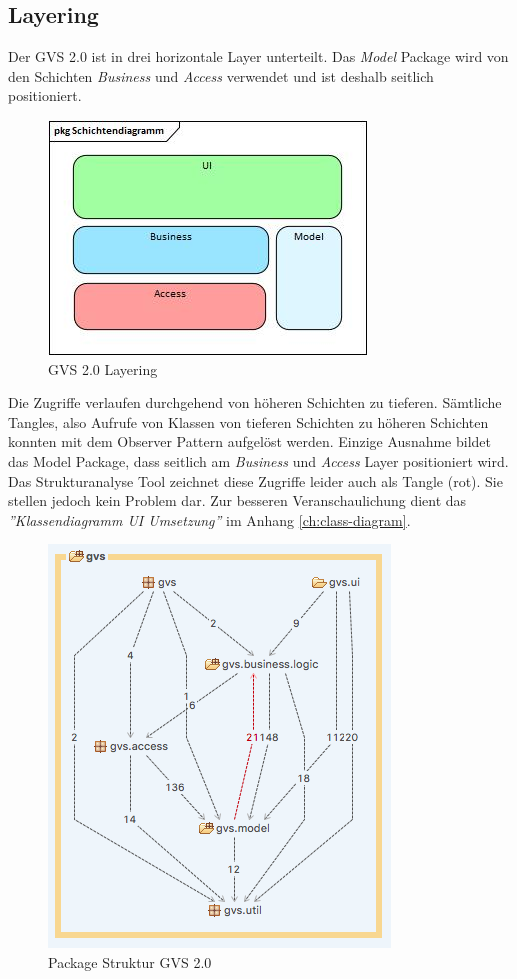 \documentclass[11pt,a4paper,english,oneside]{book}
\numberwithin{equation}{chapter}
\begin{document}
	\subsection{Layering}
	Der GVS 2.0 ist in drei horizontale Layer unterteilt. Das \textit{Model} Package wird von den Schichten \textit{Business} und \textit{Access} verwendet und ist deshalb seitlich positioniert.
	
	\begin{figure}[h!]
		\centering
		\includegraphics[width=0.5\linewidth]{assets/images/layering}
		\caption{GVS 2.0 Layering}
		\label{fig:layering}
	\end{figure}
	
	\noindent
	Die Zugriffe verlaufen durchgehend von höheren Schichten zu tieferen. Sämtliche Tangles, also Aufrufe von Klassen von tieferen Schichten zu höheren Schichten konnten mit dem Observer Pattern aufgelöst werden. Einzige Ausnahme bildet das Model Package, dass seitlich am \textit{Business} und \textit{Access} Layer positioniert wird. Das Strukturanalyse Tool zeichnet diese Zugriffe leider auch als Tangle (rot). Sie stellen jedoch kein Problem dar. Zur besseren Veranschaulichung dient das \textit{''Klassendiagramm UI Umsetzung''} im Anhang \ref{ch:class-diagram}.
	
	\begin{figure}[h!]
		\centering
		\includegraphics[width=0.4\linewidth]{assets/images/structure-gvs2}
		\caption{Package Struktur GVS 2.0}
		\label{fig:structure-gvs2}
	\end{figure}
	
\end{document}
